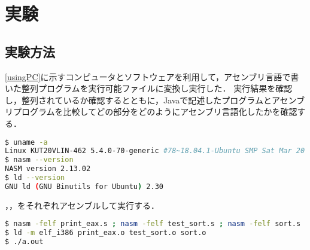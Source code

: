 \section{実験}
\subsection{実験方法}
\ref{usingPC}に示すコンピュータとソフトウェアを利用して，アセンブリ言語で書いた整列プログラムを実行可能ファイルに変換し実行した．
実行結果を確認し，整列されているか確認するとともに，{\ttfamily Java}で記述したプログラムとアセンブリプログラムを比較してどの部分をどのようにアセンブリ言語化したかを確認する．
\begin{lstlisting}[frame={single},numbers={none},breakindent={0pt},language={Bash},caption={使用したコンピュータとソフトウェア},label={usingPC}]
$ uname -a
Linux KUT20VLIN-462 5.4.0-70-generic #78~18.04.1-Ubuntu SMP Sat Mar 20 14:10:07 UTC 2021 x86_64 x86_64 x86_64 GNU/Linux
$ nasm --version
NASM version 2.13.02
$ ld --version
GNU ld (GNU Binutils for Ubuntu) 2.30
\end{lstlisting}
，\testsort，をそれぞれアセンブルして実行する．
\begin{lstlisting}[frame={single},numbers={none},breakindent={0pt},language={Bash},caption={実行したコマンド},label={command1}]
$ nasm -felf print_eax.s ; nasm -felf test_sort.s ; nasm -felf sort.s
$ ld -m elf_i386 print_eax.o test_sort.o sort.o
$ ./a.out
\end{lstlisting}
